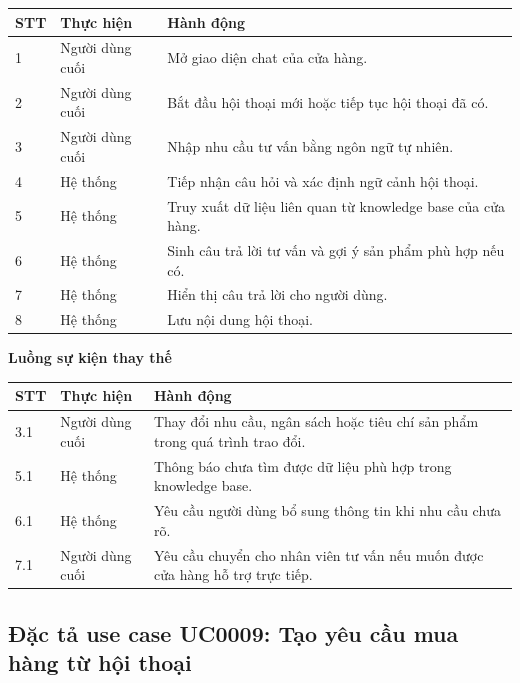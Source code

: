 \documentclass[../DoAn.tex]{subfiles}
\begin{document}
\begin{table}[H]
\centering
\begin{tabular}{|p{}|p{}|p{}|}
\hline
\textbf{STT} & \textbf{Thực hiện} & \textbf{Hành động} \\
\hline
1 & Người dùng cuối & Mở giao diện chat của cửa hàng. \\
\hline
2 & Người dùng cuối & Bắt đầu hội thoại mới hoặc tiếp tục hội thoại đã có. \\
\hline
3 & Người dùng cuối & Nhập nhu cầu tư vấn bằng ngôn ngữ tự nhiên. \\
\hline
4 & Hệ thống & Tiếp nhận câu hỏi và xác định ngữ cảnh hội thoại. \\
\hline
5 & Hệ thống & Truy xuất dữ liệu liên quan từ knowledge base của cửa hàng. \\
\hline
6 & Hệ thống & Sinh câu trả lời tư vấn và gợi ý sản phẩm phù hợp nếu có. \\
\hline
7 & Hệ thống & Hiển thị câu trả lời cho người dùng. \\
\hline
8 & Hệ thống & Lưu nội dung hội thoại. \\
\hline
\end{tabular}
\end{table}

\textbf{Luồng sự kiện thay thế}

\begin{table}[H]
\centering
\begin{tabular}{|p{}|p{}|p{}|}
\hline
\textbf{STT} & \textbf{Thực hiện} & \textbf{Hành động} \\
\hline
3.1 & Người dùng cuối & Thay đổi nhu cầu, ngân sách hoặc tiêu chí sản phẩm trong quá trình trao đổi. \\
\hline
5.1 & Hệ thống & Thông báo chưa tìm được dữ liệu phù hợp trong knowledge base. \\
\hline
6.1 & Hệ thống & Yêu cầu người dùng bổ sung thông tin khi nhu cầu chưa rõ. \\
\hline
7.1 & Người dùng cuối & Yêu cầu chuyển cho nhân viên tư vấn nếu muốn được cửa hàng hỗ trợ trực tiếp. \\
\hline
\end{tabular}
\end{table}

\subsection{Đặc tả use case UC0009: Tạo yêu cầu mua hàng từ hội thoại}
\label{subsection:2.3.5}
\end{document}
